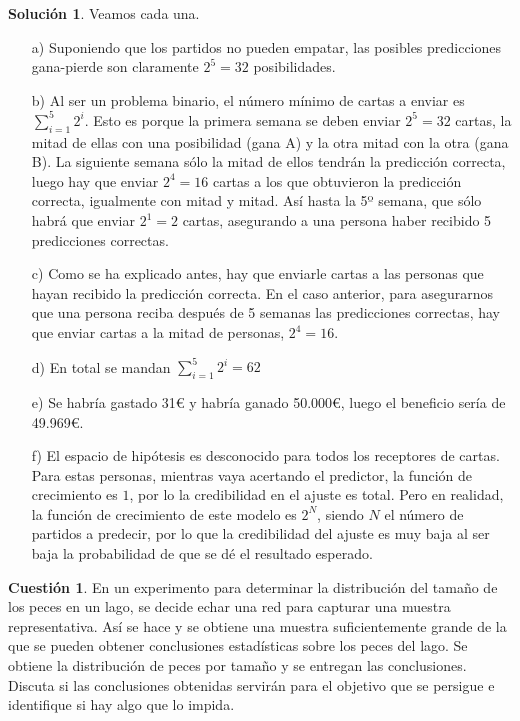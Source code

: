 \documentclass[a4paper, 11pt]{article}
\theoremstyle{definition}
\newtheorem{cuestion}{Cuestión}
\newtheorem*{solucion}{Solución}
\begin{document}
  \begin{solucion}
    Veamos cada una.

    \begin{enumerate}
      \item[a)] Suponiendo que los partidos no pueden empatar, las posibles predicciones gana-pierde son claramente $2^5=32$ posibilidades.
      \item[b)] Al ser un problema binario, el número mínimo de cartas a enviar es $\sum_{i=1}^5 2^i$. Esto es porque la primera semana se deben enviar $2^5=32$ cartas, la mitad de ellas con una posibilidad (gana A) y la otra mitad con la otra (gana B). La siguiente semana sólo la mitad de ellos tendrán la predicción correcta, luego hay que enviar $2^4=16$ cartas a los que obtuvieron la predicción correcta, igualmente con mitad y mitad. Así hasta la 5º semana, que sólo habrá que enviar $2^1=2$ cartas, asegurando a una persona haber recibido 5 predicciones correctas.
      \item[c)] Como se ha explicado antes, hay que enviarle cartas a las personas que hayan recibido la predicción correcta. En el caso anterior, para asegurarnos que una persona reciba después de 5 semanas las predicciones correctas, hay que enviar cartas a la mitad de personas, $2^4=16$.
      \item[d)] En total se mandan $\sum_{i=1}^5 2^i = 62$
      \item[e)] Se habría gastado 31\euro{} y habría ganado 50.000\euro{}, luego el beneficio sería de 49.969\euro{}.
      \item[f)] El espacio de hipótesis es desconocido para todos los receptores de cartas. Para estas personas, mientras vaya acertando el predictor, la función de crecimiento es $1$, por lo la credibilidad en el ajuste es total. Pero en realidad, la función de crecimiento de este modelo es $2^N$, siendo $N$ el número de partidos a predecir, por lo que la credibilidad del ajuste es muy baja al ser baja la probabilidad de que se dé el resultado esperado.
    \end{enumerate}
  \end{solucion}

  \begin{cuestion}
    En un experimento para determinar la distribución del tamaño de los peces en un lago, se decide echar una red para capturar una muestra representativa. Así se hace y se obtiene una muestra suficientemente grande de la que se pueden obtener conclusiones estadísticas sobre los peces del lago. Se obtiene la distribución de peces por tamaño y se entregan las conclusiones. Discuta si las conclusiones obtenidas servirán para el objetivo que se persigue e identifique si hay algo que lo impida.
  \end{cuestion}
\end{document}
